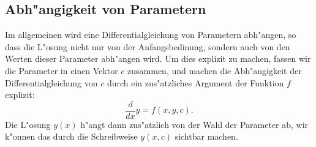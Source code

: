 %

\subsection{Abh"angigkeit von Parametern}
Im allgemeinen wird eine Differentialgleichung von Parametern abh"angen,
so dass die L"osung nicht nur von der Anfangsbedinung, sondern auch von den
Werten dieser Parameter abh"angen wird.
Um dies explizit zu machen, fassen wir die Parameter in einen Vektor $c$
zusammen, und machen die Abh"angigkeit der Differentialgleichung
von $c$ durch ein zus"atzliches Argument der Funktion $f$ explizit:
\[
\frac{d}{dx}y = f(x,y,c).
\]
Die L"osung $y(x)$ h"angt dann zus"atzlich von der Wahl der Parameter
ab, wir k"onnen das durch die Schreibweise $y(x,c)$ sichtbar machen.


